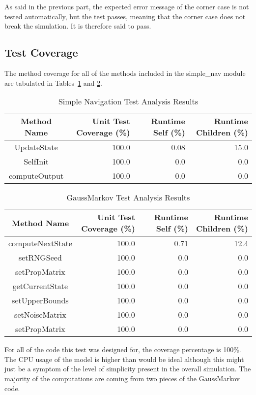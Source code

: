 As said in the previous part, the expected error message of the corner case is not tested automatically,
but the test passes, meaning that the corner case does not break the simulation. It is therefore said to
pass.



\subsection{Test Coverage}
The method coverage for all of the methods included in the simple\_nav 
module are tabulated in Tables~\ref{tab:cov_met} and \ref{tab:cov_met2}.

\begin{table}[htbp]
	\caption{Simple Navigation Test Analysis Results}
	\label{tab:cov_met}
	\centering \fontsize{10}{10}\selectfont
	\begin{tabular}{c | r | r | r} %
		\hline
		Method Name    & Unit Test Coverage (\%) & Runtime Self (\%) & Runtime Children (\%) \\
		\hline
		UpdateState & 100.0 & 0.08 & 15.0 \\
		SelfInit & 100.0 & 0.0 & 0.0 \\
		computeOutput & 100.0 & 0.0 & 0.0 \\
		\hline
	\end{tabular}
\end{table}

\begin{table}[htbp]
	\caption{GaussMarkov Test Analysis Results}
	\label{tab:cov_met2}
	\centering \fontsize{10}{10}\selectfont
	\begin{tabular}{c | r | r | r} %
		\hline
		Method Name    & Unit Test Coverage (\%) & Runtime Self (\%) & Runtime Children (\%) \\
		\hline
		computeNextState & 100.0 & 0.71 & 12.4 \\
		setRNGSeed & 100.0 & 0.0 & 0.0 \\
		setPropMatrix & 100.0 & 0.0 & 0.0 \\
		getCurrentState & 100.0 & 0.0 & 0.0 \\
		setUpperBounds & 100.0 & 0.0 & 0.0 \\
		setNoiseMatrix & 100.0 & 0.0 & 0.0 \\
		setPropMatrix & 100.0 & 0.0 & 0.0 \\
		\hline
	\end{tabular}
\end{table}
For all of the code this test was designed for, the coverage percentage is 
100\%.  The CPU usage of the model is higher than would be ideal although this 
might just be a symptom of the level of simplicity present in the overall 
simulation.  The majority of the computations are coming from two pieces of the 
GaussMarkov code.  

